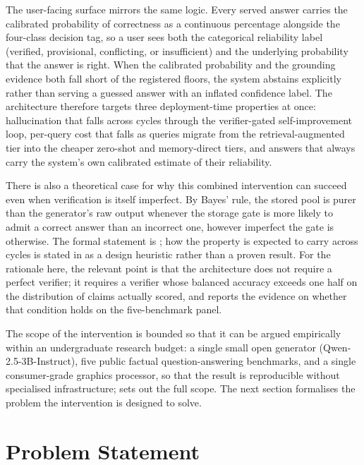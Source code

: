 The user-facing surface mirrors the same logic. Every served answer carries the calibrated probability of correctness as a continuous percentage alongside the four-class decision tag, so a user sees both the categorical reliability label (verified, provisional, conflicting, or insufficient) and the underlying probability that the answer is right. When the calibrated probability and the grounding evidence both fall short of the registered floors, the system abstains explicitly rather than serving a guessed answer with an inflated confidence label. The architecture therefore targets three deployment-time properties at once: hallucination that falls across cycles through the verifier-gated self-improvement loop, per-query cost that falls as queries migrate from the retrieval-augmented tier into the cheaper zero-shot and memory-direct tiers, and answers that always carry the system's own calibrated estimate of their reliability.

There is also a theoretical case for why this combined intervention can succeed even when verification is itself imperfect. By Bayes' rule, the stored pool is purer than the generator's raw output whenever the storage gate is more likely to admit a correct answer than an incorrect one, however imperfect the gate is otherwise. The formal statement is ; how the property is expected to carry across cycles is stated in  as a design heuristic rather than a proven result. For the rationale here, the relevant point is that the architecture does not require a perfect verifier; it requires a verifier whose balanced accuracy exceeds one half on the distribution of claims actually scored, and  reports the evidence on whether that condition holds on the five-benchmark panel.

The scope of the intervention is bounded so that it can be argued empirically within an undergraduate research budget: a single small open generator (Qwen-2.5-3B-Instruct), five public factual question-answering benchmarks, and a single consumer-grade graphics processor, so that the result is reproducible without specialised infrastructure;  sets out the full scope. The next section formalises the problem the intervention is designed to solve.

\section{Problem Statement}
\label{sec:problem}

